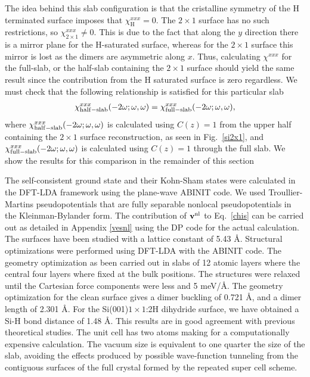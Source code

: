 \documentclass[floatfix,prb,aps,superscriptaddress,11pt,preprint,letterpaper]{revtex4}
\def\chon{black}
\begin{document}
The idea {\color{\chon} behind this slab configuration} is that the 
cristalline symmetry of the H terminated surface imposes that 
$\chi_{\mathrm{H}}^{xxx}=0${\color{\chon}.
 The $2\times 1$ surface has no 
such restrictions, so} $\chi_{2\times 1}^{xxx}\ne 0$.
This is due to the fact that along the $y$ direction there is a mirror plane for the
H-saturated surface, whereas 
for the $2\times 1$ surface this mirror is lost as the dimers are
asymmetric along $x$. 
Thus, calculating $\chi^{xxx}$ for the full-slab, or the 
{\color{\chon} half-slab containing} the $2\times 1$ surface\cite{nota1}
{\color{\chon} should yield the} same result since the contribution from the H
saturated surface is zero {\color{\chon} regardless. 
We must check that the following 
relationship is satisfied for this particular slab}
\begin{align}\label{hs}
\chi_{\mathrm{half-slab}}^{xxx}(-2\omega;\omega,\omega) 
=
\chi_{\mathrm{full-slab}}^{xxx}(-2\omega;\omega,\omega) 
,
\end{align}
where
$\chi_{\mathrm{half-slab}}^{xxx}(-2\omega;\omega,\omega)$ is calculated using
$C(z)=1$ {\color{\chon} from the upper half containing the }$2\times 1$ 
surface reconstruction, as seen in Fig.~\ref{si2x1},
and $\chi_{\mathrm{full-slab}}^{xxx}(-2\omega;\omega,\omega)$ is calculated using
$C(z)=1$ through the full slab.
{\color{\chon} We show the results for this comparison in the remainder 
of this section}


The self-consistent ground state and their Kohn-Sham states were
calculated in the {\color{\chon} DFT-LDA framework using} the plane-wave 
ABINIT code.\cite{abinit}
We used Troullier-Martins pseudopotentials\cite{troullierPRB91} that are 
fully separable nonlocal pseudopotentials in the Kleinman-Bylander 
{\color{\chon} form.\cite{kleinmanPRL82}
The contribution of $\mathbf{v}^{\mathrm{nl}}$ to Eq.~\eqref{chis} can be carried out 
as detailed in Appendix \ref{vesnl} using the DP code for 
the actual calculation}.\cite{francesco}
%
The surfaces have been studied with a lattice constant of 5.43 \AA. 
Structural optimizations were performed using DFT-LDA
with the ABINIT code.\cite{abinit}  
The geometry optimization as been carried out in slabs of 12
atomic layers where the central four layers where fixed at the bulk
positions.  
The structures were relaxed until the Cartesian force components were less and 5 meV/\AA. 
The geometry optimization for the clean surface gives
a dimer buckling of 0.721 \AA, and a dimer length of 2.301 \AA.  
For the  Si(001)$1\times 1$:2H dihydride surface, we have obtained a Si-H bond distance of 1.48 \AA. 
This results are in good agreement with previous 
theoretical studies.\cite{caramellaPRB09,mendozaPRB06}
%
The unit cell has two atoms {\color{\chon} making for a computationally
expensive calculation.} 
The vacuum size is equivalent to one {\color{\chon} quarter the} 
size of the slab, {\color{\chon} avoiding the effects produced by possible 
wave-function tunneling} from the contiguous surfaces of the full
crystal formed by the repeated super cell scheme.\cite{mendozaPRB06}    
\end{document}
